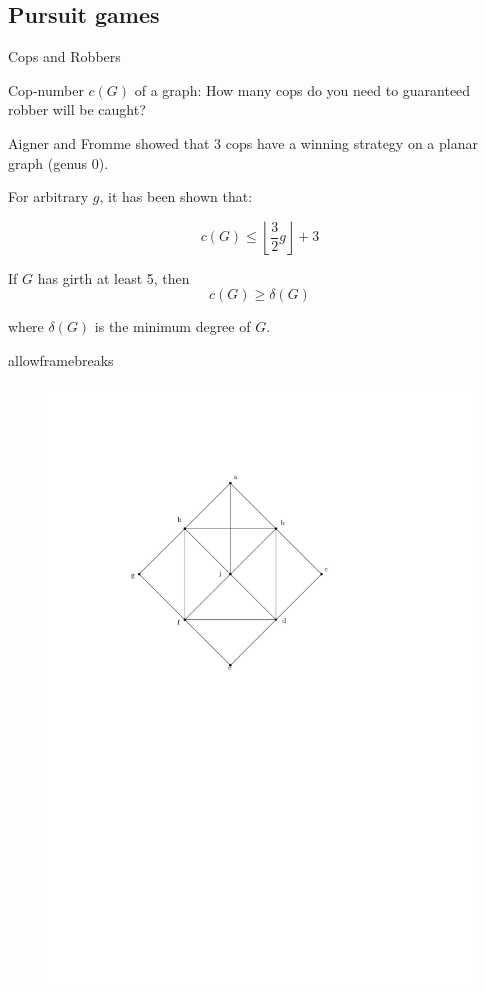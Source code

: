 \documentclass[compress]{beamer}
\begin{document}
\subsection{Pursuit games}
\begin{frame}{Cops and Robbers}

Cop-number $c(G)$ of a graph: How many cops do you need to guaranteed robber will be caught?

\medskip

Aigner and Fromme showed that 3 cops have a winning strategy on a planar graph (genus 0).

\medskip

For arbitrary $g$, it has been shown that:

\[ c(G) \leq  \left\lfloor \frac{3}{2} g \right\rfloor + 3\]

\medskip

If $G$ has girth at least 5, then
\[ c(G) \geq \delta(G) \]

where $\delta(G)$ is the minimum degree of $G$.
\end{frame}


\begin{frame}{allowframebreaks}
  \begin{figure}
    \centering
    \includegraphics[width=0.8\framewidth]{img/dismantle1.pdf}
  \end{figure}
\end{frame}
\end{document}
